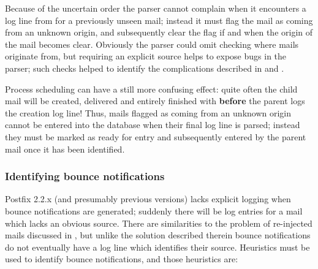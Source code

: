 Because of the uncertain order the parser cannot complain when it
encounters a log line from  for a previously unseen mail;
instead it must flag the mail as coming from an unknown origin, and
subsequently clear the flag if and when the origin of the mail becomes
clear.  Obviously the parser could omit checking where mails originate
from, but requiring an explicit source helps to expose bugs in the parser;
such checks helped to identify the complications described in
 and .

Process scheduling can have a still more confusing effect: quite often the
child mail will be created, delivered and entirely finished with
\textbf{before} the parent logs the creation log line!  Thus, mails flagged
as coming from an unknown origin cannot be entered into the database when
their final log line is parsed; instead they must be marked as ready for
entry and subsequently entered by the parent mail once it has been
identified.

\subsubsection{Identifying bounce notifications}

\label{identifying-bounce-notifications}

Postfix 2.2.x (and presumably previous versions) lacks explicit logging
when bounce notifications are generated; suddenly there will be log entries
for a mail which lacks an obvious source.  There are similarities to the
problem of re-injected mails discussed in , but unlike the solution described therein bounce notifications do
not eventually have a log line which identifies their source.  Heuristics
must be used to identify bounce notifications, and those heuristics are:

